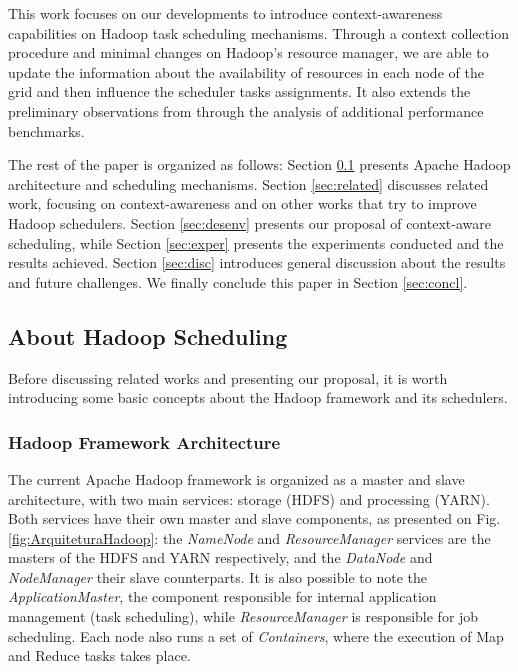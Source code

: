 This work focuses on our developments to introduce context-awareness capabilities on Hadoop task scheduling mechanisms. Through a context collection procedure and minimal changes on Hadoop's resource manager, we are able to update the information about the availability of resources in each node of the grid and then influence the scheduler tasks assignments. It also extends the preliminary observations from \cite{Cassales2015202} through the analysis of additional performance benchmarks.

The rest of the paper is organized as follows: Section \ref{sec:refteo} presents Apache Hadoop architecture and scheduling mechanisms. 
Section \ref{sec:related} discusses related work, focusing on context-awareness and on other works that try to improve Hadoop schedulers. 
Section \ref{sec:desenv} presents our proposal of context-aware scheduling, while Section \ref{sec:exper} presents the experiments conducted and the results achieved. Section \ref{sec:disc} introduces general discussion about the results and future challenges. We finally conclude this paper in Section \ref{sec:concl}.

\subsection{About Hadoop Scheduling} \label{sec:refteo}

Before discussing related works and presenting our proposal, it is worth introducing some basic concepts about the Hadoop framework and its schedulers. 

\subsubsection{Hadoop Framework Architecture}

The current Apache Hadoop framework is organized as a master and slave architecture, with two main services: storage (HDFS) and processing (YARN). Both services have their own master and slave components, as presented on Fig. \ref{fig:ArquiteturaHadoop}: the \textit{NameNode} and \textit{ResourceManager} services are the masters of the HDFS and YARN respectively, and the \textit{DataNode} and \textit{NodeManager} their slave counterparts. It is also possible to note the \textit{ApplicationMaster}, the component responsible for internal application management (task scheduling), while \textit{ResourceManager} is responsible for job scheduling. Each node also runs a set of \textit{Containers}, where the execution of Map and Reduce tasks takes place. 

